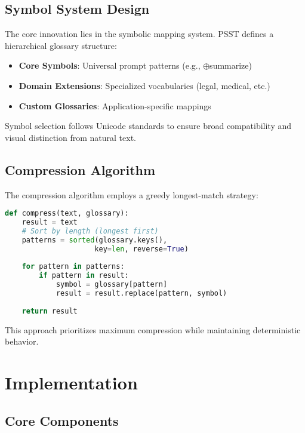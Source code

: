 \documentclass[11pt,twocolumn]{article}
\begin{document}
\subsection{Symbol System Design}

The core innovation lies in the symbolic mapping system. PSST defines a hierarchical glossary structure:

\begin{itemize}
\item \textbf{Core Symbols}: Universal prompt patterns (e.g., $\oplus$summarize)
\item \textbf{Domain Extensions}: Specialized vocabularies (legal, medical, etc.)
\item \textbf{Custom Glossaries}: Application-specific mappings
\end{itemize}

Symbol selection follows Unicode standards to ensure broad compatibility and visual distinction from natural text.

\subsection{Compression Algorithm}

The compression algorithm employs a greedy longest-match strategy:

\begin{lstlisting}[language=Python, caption=Core Compression Algorithm]
def compress(text, glossary):
    result = text
    # Sort by length (longest first)
    patterns = sorted(glossary.keys(), 
                     key=len, reverse=True)
    
    for pattern in patterns:
        if pattern in result:
            symbol = glossary[pattern]
            result = result.replace(pattern, symbol)
    
    return result
\end{lstlisting}

This approach prioritizes maximum compression while maintaining deterministic behavior.

\section{Implementation}

\subsection{Core Components}
\end{document}
